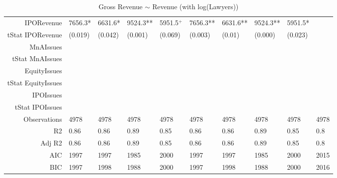 \begin{table}[ht]
\begin{tabular}{rlllllllll}
  IPORevenue & 7656.3* & 6631.6* & 9524.3** & 5951.5$^{+}$ & 7656.3** & 6631.6** & 9524.3** & 5951.5* &  \\ 
  tStat IPORevenue & (0.019) & (0.042) & (0.001) & (0.069) & (0.003) & (0.01) & (0.000) & (0.023) &  \\ 
  MnAIssues &  &  &  &  &  &  &  &  &  \\ 
  tStat MnAIssues &  &  &  &  &  &  &  &  &  \\ 
  EquityIssues &  &  &  &  &  &  &  &  &  \\ 
  tStat EquityIssues &  &  &  &  &  &  &  &  &  \\ 
  IPOIssues &  &  &  &  &  &  &  &  &  \\ 
  tStat IPOIssues &  &  &  &  &  &  &  &  &  \\ 
  Observations & 4978 & 4978 & 4978 & 4978 & 4978 & 4978 & 4978 & 4978 & 4978 \\ 
  R2 & 0.86 & 0.86 & 0.89 & 0.85 & 0.86 & 0.86 & 0.89 & 0.85 & 0.8 \\ 
  Adj R2 & 0.86 & 0.86 & 0.89 & 0.85 & 0.86 & 0.86 & 0.89 & 0.85 & 0.8 \\ 
  AIC & 1997 & 1997 & 1985 & 2000 & 1997 & 1997 & 1985 & 2000 & 2015 \\ 
  BIC & 1997 & 1998 & 1988 & 2000 & 1997 & 1998 & 1988 & 2000 & 2016 \\ 
   \hline
\end{tabular}
\caption{Gross Revenue $\sim$ Revenue (with log(Lawyers))} 
\end{table}
